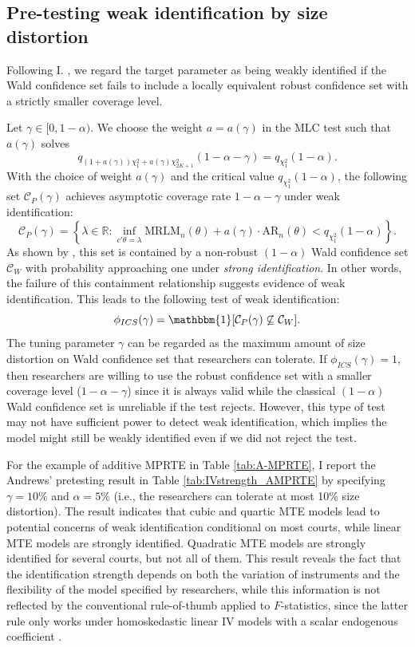 \documentclass[11pt]{article}
\theoremstyle{definition}
\newcommand{\R}{\ensuremath{\mathbb{R}}}
\newcommand{\0}{\ensuremath{\mathbf{0}}}
\newcommand{\indicator}{\ensuremath{\mathbbm{1}}}
\begin{document}
\begin{bibunit}
\subsection{Pre-testing weak identification by size distortion}
Following I. \cite{andrews.i:2018}, we regard the target parameter as being weakly identified if the Wald confidence set fails to include a locally equivalent robust confidence set with a strictly smaller coverage level.

Let $\gamma \in [0,1-\alpha)$. We choose the weight $a = a(\gamma)$ in the MLC test such that $a(\gamma)$ solves
\[
	q_{(1+a(\gamma))\chi_1^2 + a(\gamma)\chi_{2K+1}^2}(1 - \alpha - \gamma) = q_{\chi_1^2}(1-\alpha).
\]
With the choice of weight $a(\gamma)$ and the critical value $q_{\chi_1^2}(1-\alpha)$, the following set $\mathcal{C}_P(\gamma)$ achieves asymptotic coverage rate $1-\alpha-\gamma$ under weak identification:
\[
	\mathcal{C}_{P}(\gamma) = \left\{\lambda\in\R: \inf_{c'\theta = \lambda}\text{MRLM}_n(\theta) + a(\gamma)\cdot \text{AR}_n(\theta) < q_{\chi_1^2}(1-\alpha)\right\}.
\]
As shown by \citet[Theorem 3]{andrews.i:2018}, this set is contained by a non-robust $(1-\alpha)$ Wald confidence set $\mathcal{C}_{W}$ with probability approaching one under \textit{strong identification}. In other words, the failure of this containment relationship suggests evidence of weak identification. This leads to the following test of weak identification:
\[
	\phi_{ICS}(\gamma) = \indicator[\mathcal{C}_P(\gamma) \not\subseteq \mathcal{C}_W].
\]
The tuning parameter $\gamma$ can be regarded as the maximum amount of size distortion on Wald confidence set that researchers can tolerate. If $\phi_{ICS}(\gamma) = 1$, then researchers are willing to use the robust confidence set with a smaller coverage level ($1-\alpha-\gamma$) since it is always valid while the classical $(1-\alpha)$ Wald confidence set is unreliable if the test rejects. However, this type of test may not have sufficient power to detect weak identification, which implies the model might still be weakly identified even if we did not reject the test.

For the example of additive MPRTE in Table \ref{tab:A-MPRTE}, I report the Andrews' pretesting result in Table \ref{tab:IVstrength_AMPRTE} by specifying $\gamma = 10\%$ and $\alpha = 5\%$ (i.e., the researchers can tolerate at most 10\% size distortion). The result indicates that cubic and quartic MTE models lead to potential concerns of weak identification conditional on most courts, while linear MTE models are strongly identified. Quadratic MTE models are strongly identified for several courts, but not all of them. This result reveals the fact that the identification strength depends on both the variation of instruments and the flexibility of the model specified by researchers, while this information is not reflected by the conventional rule-of-thumb applied to $F$-statistics, since the latter rule only works under homoskedastic linear IV models with a scalar endogenous coefficient \citep{andrews/stock/sun:2019}.




\end{bibunit}
\end{document}
